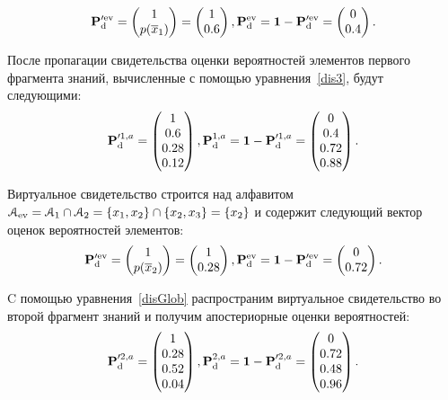 \begin{equation*}
\mathbf{P}_\mathrm{d}^{\prime \mathrm{ev}} = \begin{pmatrix}  1 \\ p(\overline{x}_1)	\end{pmatrix} = \begin{pmatrix}
1 \\ 0.6
\end{pmatrix},
\mathbf{P}_\mathrm{d}^{\mathrm{ev}} = \mathbf{1} - \mathbf{P}_\mathrm{d}^{\prime \mathrm{ev}} =  \begin{pmatrix}
0 \\ 0.4 \end{pmatrix}.
\end{equation*}

После пропагации свидетельства оценки вероятностей элементов первого фрагмента знаний, вычисленные с помощью уравнения~\ref{dis3}, будут следующими:
\begin{equation*}
\mathbf{P}_\mathrm{d}^{\prime 1,a} = \begin{pmatrix}
1 \\  0.6 \\ 0.28 \\ 0.12
\end{pmatrix},
\mathbf{P}_\mathrm{d}^{1,a}= \mathbf{1} - \mathbf{P}_\mathrm{d}^{\prime 1,a} = \begin{pmatrix}
0 \\  0.4 \\ 0.72 \\ 0.88
\end{pmatrix}.
\end{equation*}

Виртуальное свидетельство строится над алфавитом $\mathcal{A}_{\mathrm{ev}} = \mathcal{A}_1 \cap \mathcal{A}_2 = \{x_1, x_2\} \cap \{x_2, x_3\} = \{x_2\}$ и содержит следующий вектор оценок вероятностей элементов:
\begin{equation*}
\mathbf{P}_\mathrm{d}^{\prime \mathrm{ev}} = \begin{pmatrix}  1 \\ p(\overline{x}_2)	\end{pmatrix} = 
\begin{pmatrix} 1 \\ 0.28 \end{pmatrix},
\mathbf{P}_\mathrm{d}^{\mathrm{ev}} = \mathbf{1} - \mathbf{P}_\mathrm{d}^{\prime \mathrm{ev}} = \begin{pmatrix} 0 \\ 0.72 \end{pmatrix}.
\end{equation*}

C помощью уравнения~\ref{disGlob} распространим виртуальное свидетельство во второй фрагмент знаний и получим апостериорные оценки вероятностей:
\begin{equation*}
\mathbf{P}_\mathrm{d}^{\prime 2,a} = \begin{pmatrix}
1 \\ 0.28 \\ 0.52 \\ 0.04
\end{pmatrix},
 \mathbf{P}_\mathrm{d}^{2,a}  = \mathbf{1} - \mathbf{P}_\mathrm{d}^{\prime 2,a} = \begin{pmatrix}
0 \\ 0.72 \\ 0.48 \\ 0.96
\end{pmatrix}.
\end{equation*}

